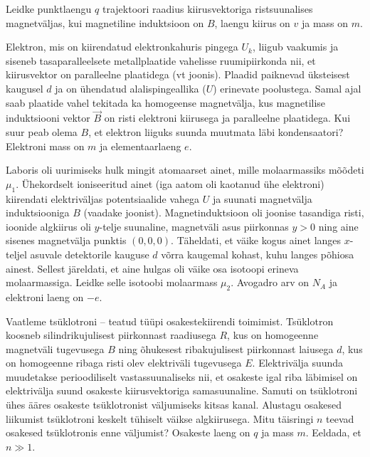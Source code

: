 \documentclass[a4paper,11pt,twocolumn]{article}
\begin{document}
\begin{question}
	Leidke punktlaengu $q$ trajektoori raadius kiirusvektoriga ristsuunalises magnetväljas, kui magnetiline induktsioon on $B$, laengu kiirus on $v$ ja mass on $m$.
\end{question}

\begin{question}[VKV 2018, P2]
	Elektron, mis on kiirendatud elektronkahuris pingega $U_k$, liigub vaakumis ja siseneb tasaparalleelsete metallplaatide vahelisse ruumipiirkonda nii, et kiirusvektor on paralleelne plaatidega (vt joonis). Plaadid paiknevad üksteisest kaugusel $d$ ja on ühendatud alalispingeallika ($U$) erinevate poolustega. Samal ajal saab plaatide vahel tekitada ka homogeense magnetvälja, kus magnetilise induktsiooni vektor $\vec{B}$ on risti elektroni kiirusega ja paralleelne plaatidega. Kui suur peab olema $B$, et elektron liiguks suunda muutmata läbi kondensaatori? Elektroni mass on $m$ ja elementaarlaeng $e$.
\end{question}

\begin{question}[Piirk 2013, G10]
	Laboris oli uurimiseks hulk mingit atomaarset ainet, mille molaarmassiks mõõdeti $\mu_1$. Ühekordselt ioniseeritud ainet (iga aatom oli kaotanud ühe elektroni) kiirendati elektriväljas potentsiaalide vahega $U$ ja suunati magnetvälja induktsiooniga $B$ (vaadake joonist). Magnetinduktsioon oli joonise tasandiga risti, ioonide algkiirus oli $y$-telje suunaline, magnetväli asus piirkonnas $y > 0$ ning aine sisenes magnetvälja punktis $(0, 0, 0)$. Täheldati, et väike kogus ainet langes $x$-teljel asuvale detektorile kauguse $d$ võrra kaugemal kohast, kuhu langes põhiosa ainest. Sellest järeldati, et aine hulgas oli väike osa isotoopi erineva molaarmassiga. Leidke selle isotoobi molaarmass $\mu_2$. Avogadro arv on $N_A$ ja elektroni laeng on $−e$.
\end{question}

\begin{question}[Piirk 2018, G10]
	Vaatleme tsüklotroni -- teatud tüüpi osakestekiirendi toimimist. Tsüklotron koosneb silindrikujulisest piirkonnast raadiusega $R$, kus on homogeenne magnetväli tugevusega $B$ ning õhukesest ribakujulisest piirkonnast laiusega $d$, kus on homogeenne ribaga risti olev elektriväli tugevusega $E$. Elektrivälja suunda muudetakse perioodiliselt vastassuunaliseks nii, et osakeste igal riba läbimisel on elektrivälja suund osakeste kiirusvektoriga samasuunaline. Samuti on tsüklotroni ühes ääres osakeste tsüklotronist väljumiseks kitsas kanal. Alustagu osakesed liikumist tsüklotroni keskelt tühiselt väikse algkiirusega. Mitu täisringi $n$ teevad osakesed tsüklotronis enne väljumist? Osakeste laeng on $q$ ja mass $m$. Eeldada, et $n\gg 1$.
\end{question}
\end{document}
